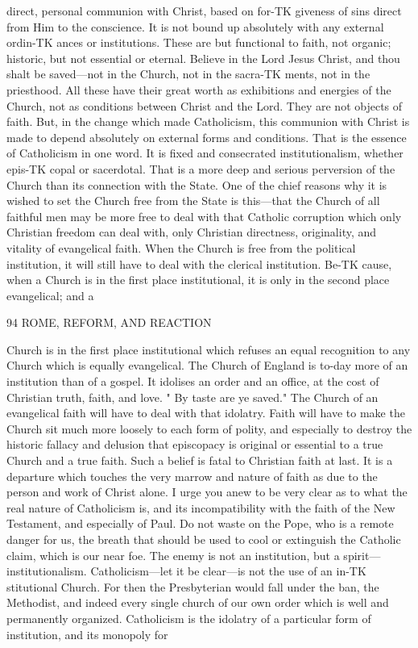 \documentclass[12pt,a5paper,oneside]{book}
\begin{document}
direct, personal communion with Christ, based on for-TK
giveness of sins direct from Him to the conscience. 
It is not bound up absolutely with any external ordin-TK
ances or institutions. These are but functional to 
faith, not organic; historic, but not essential or 
eternal. Believe in the Lord Jesus Christ, and thou 
shalt be saved---not in the Church, not in the sacra-TK
ments, not in the priesthood. All these have their 
great worth as exhibitions and energies of the Church, 
not as conditions between Christ and the Lord. They 
are not objects of faith. But, in the change which 
made Catholicism, this communion with Christ is made 
to depend absolutely on external forms and conditions. 
That is the essence of Catholicism in one word. It 
is fixed and consecrated institutionalism, whether epis-TK
copal or sacerdotal. That is a more deep and serious 
perversion of the Church than its connection with the 
State. One of the chief reasons why it is wished to 
set the Church free from the State is this---that the 
Church of all faithful men may be more free to deal 
with that Catholic corruption which only Christian 
freedom can deal with, only Christian directness, 
originality, and vitality of evangelical faith. When 
the Church is free from the political institution, it will 
still have to deal with the clerical institution. Be-TK
cause, when a Church is in the first place institutional, 
it is only in the second place evangelical; and a 



94 ROME, REFORM, AND REACTION 

Church is in the first place institutional which refuses 
an equal recognition to any Church which is equally 
evangelical. The Church of England is to-day more 
of an institution than of a gospel. It idolises an order 
and an office, at the cost of Christian truth, faith, and 
love. " By taste are ye saved." The Church of an 
evangelical faith will have to deal with that idolatry. 
Faith will have to make the Church sit much more 
loosely to each form of polity, and especially to destroy 
the historic fallacy and delusion that episcopacy is original 
or essential to a true Church and a true faith. Such a 
belief is fatal to Christian faith at last. It is a departure 
which touches the very marrow and nature of faith as 
due to the person and work of Christ alone. I urge 
you anew to be very clear as to what the real nature of 
Catholicism is, and its incompatibility with the faith of 
the New Testament, and especially of Paul. Do not 
waste on the Pope, who is a remote danger for us, the 
breath that should be used to cool or extinguish the 
Catholic claim, which is our near foe. The enemy is 
not an institution, but a spirit---institutionalism. 
Catholicism---let it be clear---is not the use of an in-TK
stitutional Church. For then the Presbyterian would 
fall under the ban, the Methodist, and indeed every 
single church of our own order which is well and 
permanently organized. Catholicism is the idolatry of 
a particular form of institution, and its monopoly for 
\end{document}
